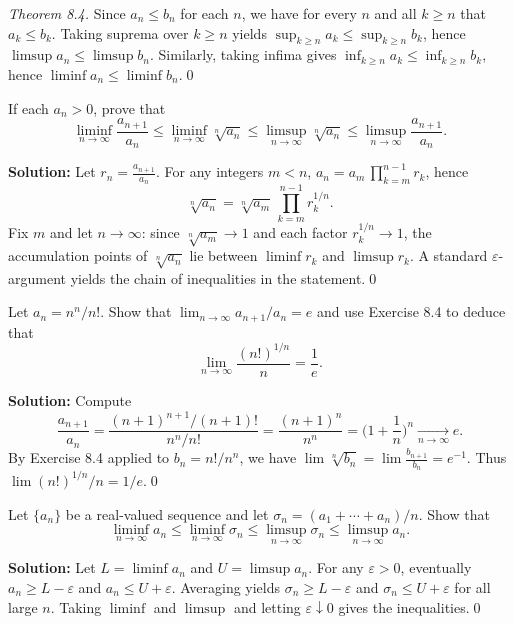 \emph{Theorem 8.4.} Since \(a_n\le b_n\) for each \(n\), we have for every \(n\) and all \(k\ge n\) that \(a_k\le b_k\). Taking suprema over \(k\ge n\) yields \(\sup_{k\ge n} a_k\le \sup_{k\ge n} b_k\), hence \(\limsup a_n\le \limsup b_n\). Similarly, taking infima gives \(\inf_{k\ge n} a_k\le \inf_{k\ge n} b_k\), hence \(\liminf a_n\le \liminf b_n\).\qed


\begin{problembox}
If each \(a_n > 0\), prove that
\[\liminf_{n \to \infty} \frac{a_{n+1}}{a_n} \leq \liminf_{n \to \infty} \sqrt[n]{a_n} \leq \limsup_{n \to \infty} \sqrt[n]{a_n} \leq \limsup_{n \to \infty} \frac{a_{n+1}}{a_n}.\]
\end{problembox}

\noindent\textbf{Solution:}
Let \(r_n=\frac{a_{n+1}}{a_n}\). For any integers \(m<n\), \(a_n=a_m\,\prod_{k=m}^{n-1} r_k\), hence
\[\sqrt[n]{a_n}=\sqrt[n]{a_m}\, \prod_{k=m}^{n-1} r_k^{1/n}.\]
Fix \(m\) and let \(n\to\infty\): since \(\sqrt[n]{a_m}\to 1\) and each factor \(r_k^{1/n}\to 1\), the accumulation points of \(\sqrt[n]{a_n}\) lie between \(\liminf r_k\) and \(\limsup r_k\). A standard \(\varepsilon\)-argument yields the chain of inequalities in the statement.\qed


\begin{problembox}
Let \(a_n = n^n / n!\). Show that \(\lim_{n \to \infty} a_{n+1} / a_n = e\) and use Exercise 8.4 to deduce that
\[\lim_{n \to \infty} \frac{(n!)^{1/n}}{n} = \frac{1}{e}.\]
\end{problembox}

\noindent\textbf{Solution:}
Compute
\[\frac{a_{n+1}}{a_n}=\frac{(n+1)^{n+1}/(n+1)!}{n^n/n!}=\frac{(n+1)^n}{n^n}=\Big(1+\frac{1}{n}\Big)^n\xrightarrow[n\to\infty]{} e.\]
By Exercise 8.4 applied to \(b_n=n!/n^n\), we have \(\lim \sqrt[n]{b_n}=\lim \frac{b_{n+1}}{b_n}=e^{-1}\). Thus \(\lim (n!)^{1/n}/n=1/e\).\qed


\begin{problembox}
Let \(\{a_n\}\) be a real-valued sequence and let \(\sigma_n = (a_1 + \cdots + a_n)/n\). Show that
\[\liminf_{n \to \infty} a_n \leq \liminf_{n \to \infty} \sigma_n \leq \limsup_{n \to \infty} \sigma_n \leq \limsup_{n \to \infty} a_n.\]
\end{problembox}

\noindent\textbf{Solution:}
Let \(L=\liminf a_n\) and \(U=\limsup a_n\). For any \(\varepsilon>0\), eventually \(a_n\ge L-\varepsilon\) and \(a_n\le U+\varepsilon\). Averaging yields \(\sigma_n\ge L-\varepsilon\) and \(\sigma_n\le U+\varepsilon\) for all large \(n\). Taking \(\liminf\) and \(\limsup\) and letting \(\varepsilon\downarrow 0\) gives the inequalities.\qed


